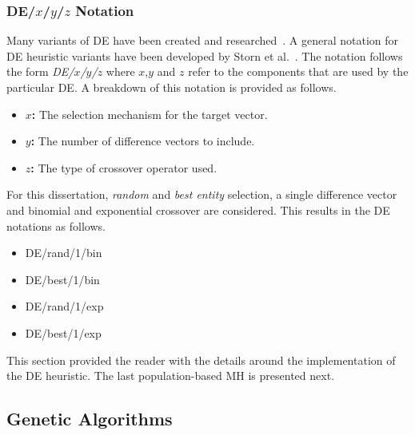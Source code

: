 \subsubsection{DE/$x$/$y$/$z$ Notation}

Many variants of \acs{DE} have been created and researched~\cite{ref:mezura:2006}. A general notation for \acs{DE} heuristic variants have been developed by Storn et al.~\cite{ref:storn:1996, ref:storn:1997}. The notation follows the form \textit{DE/$x$/$y$/$z$} where $x$,$y$ and $z$ refer to the components that are used by the particular \acs{DE}. A breakdown of this notation is provided as follows.

\begin{itemize}
      \item \textbf{$x$:} The selection mechanism for the target vector.
      \item \textbf{$y$:} The number of difference vectors to include.
      \item \textbf{$z$:} The type of crossover operator used.
\end{itemize}

\noindent
For this dissertation, \textit{random} and \textit{best entity} selection, a single difference vector and binomial and exponential crossover are considered. This results in the \acs{DE} notations as follows.

\begin{itemize}
      \item DE/rand/1/bin
      \item DE/best/1/bin
      \item DE/rand/1/exp
      \item DE/best/1/exp
\end{itemize}

\noindent
This section provided the reader with the details around the implementation of the \acs{DE} heuristic. The last population-based \acs{MH} is presented next.


\subsection{Genetic Algorithms}\label{sec:heuristics:mh:ga}

